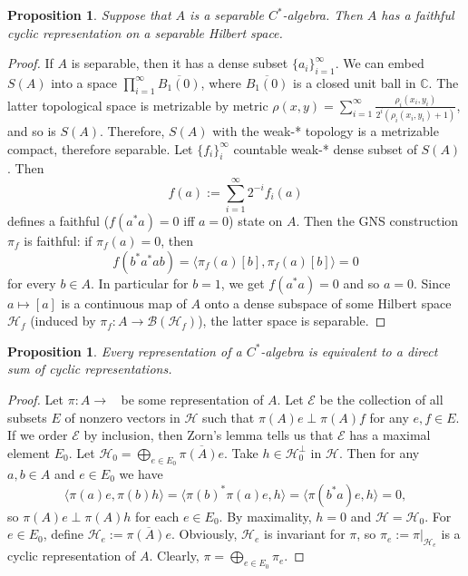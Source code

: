 \documentclass[10pt, a4paper]{article}
\newtheorem{proposition}[thm]{Proposition}
\newenvironment{noticeC}{%
  \tcolorbox[%
  notitle,
  empty,
  enhanced,  %
  breakable,
  coltext=black, 
  fontupper=\rmfamily,
  noparskip,
  sharp corners,
  boxrule=-1pt,  %
  frame hidden,
  left=7pt,  %
  right=7pt,
  top=5pt,
  bottom=5pt,
  before skip=2.5ex plus 2pt,
  after skip=2.5ex plus 2pt,
  overlay unbroken and last={%
  },
  ]}
{\endtcolorbox}
\newenvironment{myproof}%
  {\begin{noticeC}\begin{proof}}%
  {\end{proof}\end{noticeC}}
\newcommand{\C}{\mathbb {C}}
\DeclareMathOperator{\bh}{\mathcal{B} (\mathcal{H})}
\begin{document}
\begin{proposition}
  Suppose that $A$ is a separable $C^*$-algebra. Then $A$ has a faithful
  cyclic representation on a separable Hilbert space.
\end{proposition}

\begin{myproof}
  If $A$ is separable, then it has a dense subset $\{a_i\}_{i = 1} ^\infty$.
  We can embed $S(A)$ into a space $\prod_{i = 1} ^\infty \overline{B_1 (0)}$, where $\overline{B_1 (0)}$
  is a closed unit ball in $\C$. The latter topological space is metrizable by metric $\rho (x, y) = \sum_{i = 1} ^\infty \frac{\rho_i (x_i, y_i)}{2^i (\rho_i (x_i, y_i) + 1)}$,
  and so is $S(A)$. Therefore, $S(A)$ with the weak-* topology is a metrizable compact, therefore separable.
  Let $\{f_i\}_i ^{\infty}$
  countable weak-* dense subset of $S(A)$. Then 
  $$f(a) := \sum_{i = 1} ^{\infty} 2^{-i} f_i (a)$$
  defines a faithful ($f(a^* a) = 0$ iff $a = 0$) state on $A$.
  Then the GNS construction $\pi_f$ is faithful: if $\pi_f (a) = 0$, then 
  $$f(b^* a^* a b) = \langle \pi_f (a) [b], \pi_f (a) [b] \rangle = 0$$
  for every $b \in A$. In particular for $b = 1$, we get $f(a^* a) = 0$ and so $a = 0$.
  Since $a \mapsto [a]$ is 
a continuous map of $A$ onto a dense subspace of some Hilbert space $\mathcal{H}_f$ (induced by $\pi_f : A \to \mathcal{B}(\mathcal{H}_f)$), the latter space is
separable.
\end{myproof}

\begin{proposition}
  Every representation of a $C^*$-algebra is equivalent to a direct sum of cyclic representations.
\end{proposition}

\begin{myproof}
  Let $\pi: A \to \bh$ be some representation of $A$.
  Let $\mathcal{E}$ be the collection of all subsets $E$ of nonzero vectors in $\mathcal{H}$
  such that $\pi(A) e \perp \pi(A)f$ for any $e, f \in E$. If we order $\mathcal{E}$ by inclusion, 
  then Zorn's lemma tells us that $\mathcal{E}$ has a maximal element $E_0$.
  Let $\mathcal{H}_0 = \bigoplus_{e \in E_0} \overline{\pi(A) e}$. Take $h \in \mathcal{H}_0 ^{\perp}$ in $\mathcal{H}$.
  Then for any $a, b \in A$ and $e \in E_0$ we have 
  $$\langle \pi(a) e, \pi(b) h \rangle = \langle \pi(b) ^* \pi (a) e, h \rangle = \langle \pi(b^* a) e, h\rangle = 0,$$
  so $\pi(A)e \perp \pi(A)h$ for each $e \in E_0$. By maximality, $h = 0$ and $\mathcal{H} = \mathcal{H}_0$.
  For $e \in E_0$, define $\mathcal{H}_e := \overline{\pi(A) e}$.
  Obviously, $\mathcal{H}_e$ is invariant for $\pi$, so $\pi_e := \pi\big|_{\mathcal{H}_e}$ is a cyclic representation of $A$.
  Clearly, $\pi = \bigoplus_{e\in E_0} \pi_e$.
\end{myproof}
\end{document}
